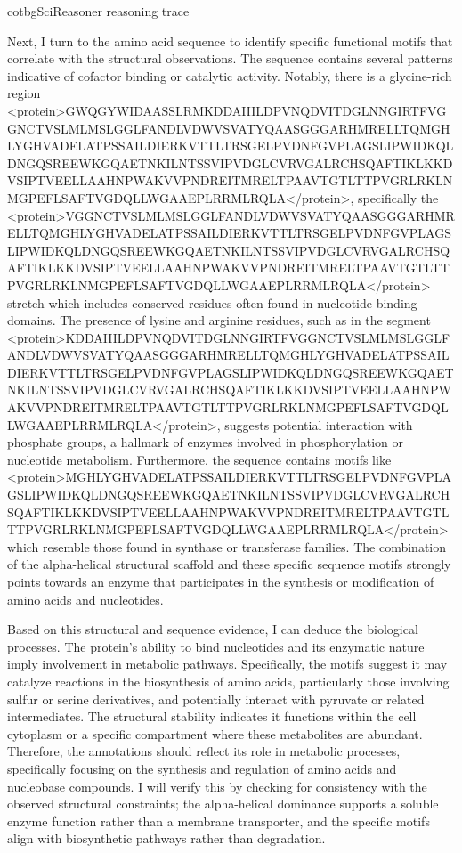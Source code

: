\begin{appendices}
\begin{fullcotsection}{cotbg}{SciReasoner reasoning trace}
\begin{cotverbatim}
Next, I turn to the amino acid sequence to identify specific functional motifs that correlate with the structural observations. The sequence contains several patterns indicative of cofactor binding or catalytic activity. Notably, there is a glycine-rich region <protein>GWQGYWIDAASSLRMKDDAIIILDPVNQDVITDGLNNGIRTFVGGNCTVSLMLMSLGGLFANDLVDWVSVATYQAASGGGARHMRELLTQMGHLYGHVADELATPSSAILDIERKVTTLTRSGELPVDNFGVPLAGSLIPWIDKQLDNGQSREEWKGQAETNKILNTSSVIPVDGLCVRVGALRCHSQAFTIKLKKDVSIPTVEELLAAHNPWAKVVPNDREITMRELTPAAVTGTLTTPVGRLRKLNMGPEFLSAFTVGDQLLWGAAEPLRRMLRQLA</protein>, specifically the <protein>VGGNCTVSLMLMSLGGLFANDLVDWVSVATYQAASGGGARHMRELLTQMGHLYGHVADELATPSSAILDIERKVTTLTRSGELPVDNFGVPLAGSLIPWIDKQLDNGQSREEWKGQAETNKILNTSSVIPVDGLCVRVGALRCHSQAFTIKLKKDVSIPTVEELLAAHNPWAKVVPNDREITMRELTPAAVTGTLTTPVGRLRKLNMGPEFLSAFTVGDQLLWGAAEPLRRMLRQLA</protein> stretch which includes conserved residues often found in nucleotide-binding domains. The presence of lysine and arginine residues, such as in the segment <protein>KDDAIIILDPVNQDVITDGLNNGIRTFVGGNCTVSLMLMSLGGLFANDLVDWVSVATYQAASGGGARHMRELLTQMGHLYGHVADELATPSSAILDIERKVTTLTRSGELPVDNFGVPLAGSLIPWIDKQLDNGQSREEWKGQAETNKILNTSSVIPVDGLCVRVGALRCHSQAFTIKLKKDVSIPTVEELLAAHNPWAKVVPNDREITMRELTPAAVTGTLTTPVGRLRKLNMGPEFLSAFTVGDQLLWGAAEPLRRMLRQLA</protein>, suggests potential interaction with phosphate groups, a hallmark of enzymes involved in phosphorylation or nucleotide metabolism. Furthermore, the sequence contains motifs like <protein>MGHLYGHVADELATPSSAILDIERKVTTLTRSGELPVDNFGVPLAGSLIPWIDKQLDNGQSREEWKGQAETNKILNTSSVIPVDGLCVRVGALRCHSQAFTIKLKKDVSIPTVEELLAAHNPWAKVVPNDREITMRELTPAAVTGTLTTPVGRLRKLNMGPEFLSAFTVGDQLLWGAAEPLRRMLRQLA</protein> which resemble those found in synthase or transferase families. The combination of the alpha-helical structural scaffold and these specific sequence motifs strongly points towards an enzyme that participates in the synthesis or modification of amino acids and nucleotides.

Based on this structural and sequence evidence, I can deduce the biological processes. The protein's ability to bind nucleotides and its enzymatic nature imply involvement in metabolic pathways. Specifically, the motifs suggest it may catalyze reactions in the biosynthesis of amino acids, particularly those involving sulfur or serine derivatives, and potentially interact with pyruvate or related intermediates. The structural stability indicates it functions within the cell cytoplasm or a specific compartment where these metabolites are abundant. Therefore, the annotations should reflect its role in metabolic processes, specifically focusing on the synthesis and regulation of amino acids and nucleobase compounds. I will verify this by checking for consistency with the observed structural constraints; the alpha-helical dominance supports a soluble enzyme function rather than a membrane transporter, and the specific motifs align with biosynthetic pathways rather than degradation.


\end{cotverbatim}
\end{fullcotsection}
\end{appendices}
